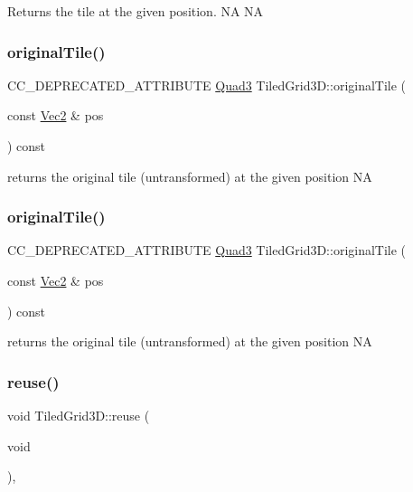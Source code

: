 Returns the tile at the given position.  NA  NA \mbox{\label{classTiledGrid3D_ae84973e0ef28dcba4eabd71210b99b1a}} 
\subsubsection{\texorpdfstring{original\+Tile()}{originalTile()}\hspace{0.1cm}{\footnotesize\ttfamily [1/2]}}
{\footnotesize\ttfamily C\+C\+\_\+\+D\+E\+P\+R\+E\+C\+A\+T\+E\+D\+\_\+\+A\+T\+T\+R\+I\+B\+U\+TE \hyperlink{structQuad3}{Quad3} Tiled\+Grid3\+D\+::original\+Tile (\begin{DoxyParamCaption}\item[{const \hyperlink{classVec2}{Vec2} \&}]{pos }\end{DoxyParamCaption}) const\hspace{0.3cm}{\ttfamily [inline]}}

returns the original tile (untransformed) at the given position  NA \mbox{\label{classTiledGrid3D_ae84973e0ef28dcba4eabd71210b99b1a}} 
\subsubsection{\texorpdfstring{original\+Tile()}{originalTile()}\hspace{0.1cm}{\footnotesize\ttfamily [2/2]}}
{\footnotesize\ttfamily C\+C\+\_\+\+D\+E\+P\+R\+E\+C\+A\+T\+E\+D\+\_\+\+A\+T\+T\+R\+I\+B\+U\+TE \hyperlink{structQuad3}{Quad3} Tiled\+Grid3\+D\+::original\+Tile (\begin{DoxyParamCaption}\item[{const \hyperlink{classVec2}{Vec2} \&}]{pos }\end{DoxyParamCaption}) const\hspace{0.3cm}{\ttfamily [inline]}}

returns the original tile (untransformed) at the given position  NA \mbox{\label{classTiledGrid3D_a5eb814b2be0d828068c1a3ae68744049}} 
\subsubsection{\texorpdfstring{reuse()}{reuse()}\hspace{0.1cm}{\footnotesize\ttfamily [1/2]}}
{\footnotesize\ttfamily void Tiled\+Grid3\+D\+::reuse (\begin{DoxyParamCaption}\item[{void}]{ }\end{DoxyParamCaption})\hspace{0.3cm}{\ttfamily [override]}, {\ttfamily [virtual]}}

